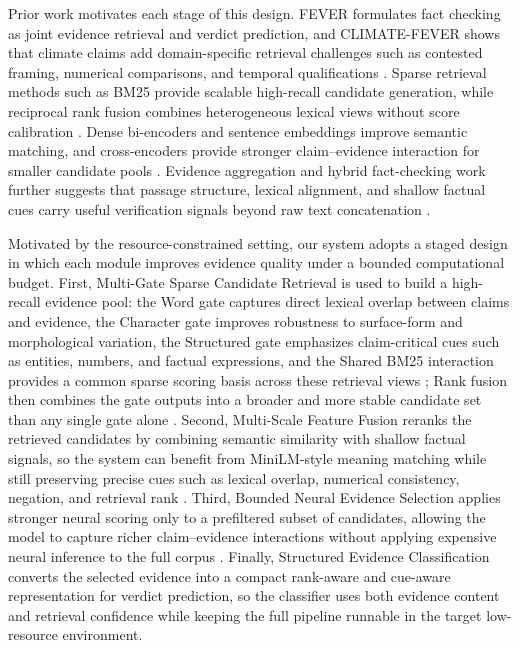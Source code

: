 \documentclass[11pt]{article}
\begin{document}
Prior work motivates each stage of this design.  FEVER formulates fact checking
as joint evidence retrieval and verdict prediction, and CLIMATE-FEVER shows that
climate claims add domain-specific retrieval challenges such as contested
framing, numerical comparisons, and temporal qualifications
\citep{thorne2018fever,diggelmann2020climatefever}.  Sparse retrieval methods
such as BM25 provide scalable high-recall candidate generation, while reciprocal
rank fusion combines heterogeneous lexical views without score calibration
\citep{robertson1994okapi,cormack2009rrf}.  Dense bi-encoders and sentence
embeddings improve semantic matching, and cross-encoders provide stronger
claim--evidence interaction for smaller candidate pools
\citep{karpukhin2020dpr,reimers2019sentence,nogueira2019bert}.  Evidence
aggregation and hybrid fact-checking work further suggests that passage
structure, lexical alignment, and shallow factual cues carry useful verification
signals beyond raw text concatenation
\citep{zhou2019gear,lee2018improving,padia2018umbc}.

Motivated by the resource-constrained setting, our system adopts a staged design
in which each module improves evidence quality under a bounded computational
budget. First, Multi-Gate Sparse Candidate Retrieval is used to build a
high-recall evidence pool: the Word gate captures direct lexical overlap
between claims and evidence, the Character gate improves robustness to
surface-form and morphological variation, the Structured gate emphasizes
claim-critical cues such as entities, numbers, and factual expressions, and the
Shared BM25 interaction provides a common sparse scoring basis across these
retrieval views \citep{robertson1994okapi}; Rank fusion then combines the gate
outputs into a broader and more stable candidate set than any single gate alone
\citep{cormack2009rrf}. Second, Multi-Scale Feature Fusion reranks the retrieved
candidates by combining semantic similarity with shallow factual signals, so
the system can benefit from MiniLM-style meaning matching while still preserving
precise cues such as lexical overlap, numerical consistency, negation, and
retrieval rank \citep{reimers2019sentence}. Third, Bounded Neural Evidence
Selection applies stronger neural scoring only to a prefiltered subset of
candidates, allowing the model to capture richer claim--evidence interactions
without applying expensive neural inference to the full corpus
\citep{nogueira2019bert}. Finally, Structured Evidence Classification converts
the selected evidence into a compact rank-aware and cue-aware representation for
verdict prediction, so the classifier uses both evidence content and retrieval
confidence while keeping the full pipeline runnable in the target low-resource
environment.
\end{document}
